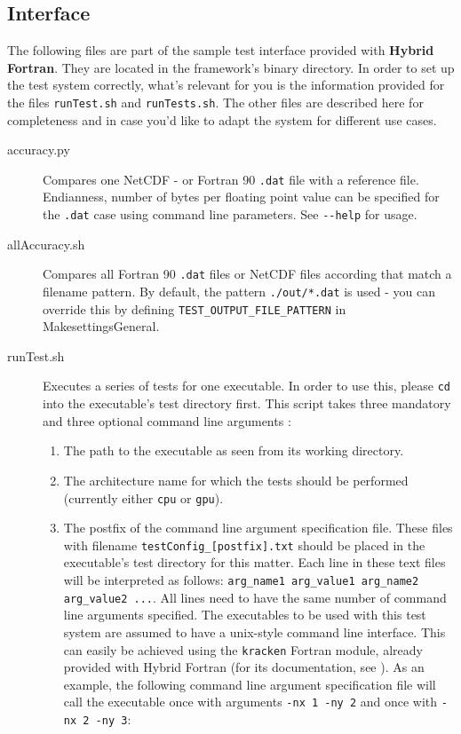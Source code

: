 \subsection{Interface} \label{sub:testInterface}
The following files are part of the sample test interface provided with \textbf{Hybrid Fortran}. They are located in the framework's binary directory. In order to set up the test system correctly, what's relevant for you is the information provided for the files \verb|runTest.sh| and \verb|runTests.sh|. The other files are described here for completeness and in case you'd like to adapt the system for different use cases.

\begin{description}
 \item [accuracy.py] Compares one NetCDF - or Fortran 90 \verb|.dat| file with a reference file. Endianness, number of bytes per floating point value can be specified for the \verb|.dat| case using command line parameters. See \verb|--help| for usage.
 \item [allAccuracy.sh] Compares all Fortran 90 \verb|.dat| files or NetCDF files according that match a filename pattern. By default, the pattern \verb|./out/*.dat| is used - you can override this by defining \verb|TEST_OUTPUT_FILE_PATTERN| in MakesettingsGeneral.
 \item [runTest.sh] Executes a series of tests for one executable. In order to use this, please \verb|cd| into the executable's test directory first. This script takes three mandatory and three optional command line arguments :
  \begin{enumerate}
   \item The path to the executable as seen from its working directory.
   \item The architecture name for which the tests should be performed (currently either \verb|cpu| or \verb|gpu|).
   \item The postfix of the command line argument specification file. These files with filename \verb|testConfig_[postfix].txt| should be placed in the executable's test directory for this matter. Each line in these text files will be interpreted as follows: \linebreak
   \verb|arg_name1 arg_value1 arg_name2 arg_value2 ...|. All lines need to have the same number of command line arguments specified. The executables to be used with this test system are assumed to have a unix-style command line interface. This can easily be achieved using the \verb|kracken| Fortran module, already provided with Hybrid Fortran (for its documentation, see \cite{Kracken}). As an example, the following command line argument specification file will call the executable once with arguments \verb|-nx 1 -ny 2| and once with \verb|-nx 2 -ny 3|:

\end{enumerate}
\end{description}
